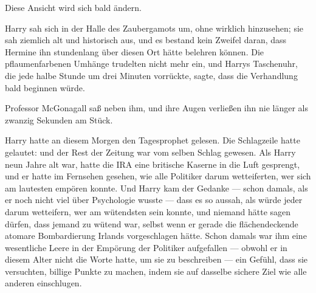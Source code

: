 Diese Ansicht wird sich bald ändern.

\later

Harry sah sich in der Halle des Zaubergamots um, ohne wirklich hinzusehen; sie sah ziemlich alt und historisch aus, und es bestand kein Zweifel daran, dass Hermine ihn stundenlang über diesen Ort hätte belehren können. Die pflaumenfarbenen Umhänge trudelten nicht mehr ein, und Harrys Taschenuhr, die jede halbe Stunde um drei Minuten vorrückte, sagte, dass die Verhandlung bald beginnen würde.

Professor McGonagall saß neben ihm, und ihre Augen verließen ihn nie länger als zwanzig Sekunden am Stück.

Harry hatte an diesem Morgen den Tagesprophet gelesen. Die Schlagzeile hatte gelautet:
und der Rest der Zeitung war vom selben Schlag gewesen. Als Harry neun Jahre alt war, hatte die IRA eine britische Kaserne in die Luft gesprengt, und er hatte im Fernsehen gesehen, wie alle Politiker darum wetteiferten, wer sich am lautesten empören konnte. Und Harry kam der Gedanke — schon damals, als er noch nicht viel über Psychologie wusste — dass es so aussah, als würde jeder darum wetteifern, wer am wütendsten sein konnte, und niemand hätte sagen dürfen, dass jemand zu wütend war, selbst wenn er gerade die flächendeckende atomare Bombardierung Irlands vorgeschlagen hätte. Schon damals war ihm eine wesentliche Leere in der Empörung der Politiker aufgefallen — obwohl er in diesem Alter nicht die Worte hatte, um sie zu beschreiben — ein Gefühl, dass sie versuchten, billige Punkte zu machen, indem sie auf dasselbe sichere Ziel wie alle anderen einschlugen.

